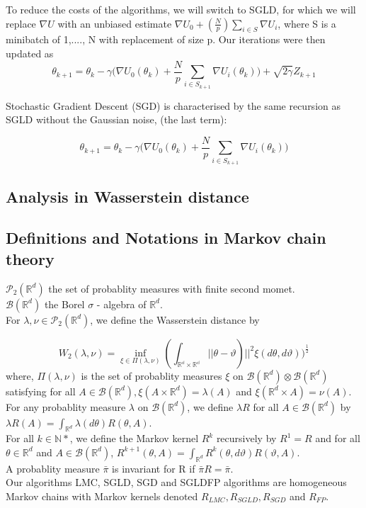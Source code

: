 To reduce the costs of the algorithms, we will switch to SGLD, for which we will replace $\nabla U$ with an unbiased estimate $\nabla U_0+(\frac{N}{p}) \sum_{i\in S}\nabla U_i$, where S is a minibatch of {1,...., N} with replacement of size p. Our iterations were then updated as
$$\theta_{k+1} = \theta_{k}-\gamma \Bigg (\nabla U_0(\theta_k)+\frac{N}{p}\sum_{i\in S_{k+1}}\nabla U_i(\theta_k)\Bigg )+\sqrt{2\gamma}Z_{k+1}$$

Stochastic Gradient Descent (SGD) is characterised by the same recursion as SGLD without the Gaussian noise, (the last term):


$$\theta_{k+1} = \theta_{k}-\gamma \Bigg (\nabla U_0(\theta_k)+\frac{N}{p}\sum_{i\in S_{k+1}}\nabla U_i(\theta_k)\Bigg)$$

\subsection{Analysis in Wasserstein distance}
\subsection{Definitions and Notations in Markov chain theory}
$\mathcal{P}_2(\mathbb{R}^d)$ the set of probablity measures with finite second momet.\\
$\mathcal{B}(\mathbb{R}^d)$ the Borel $\sigma$ - algebra of $\mathbb{R}^d$.\\
For $\lambda, \nu \in \mathcal{P}_2(\mathbb{R}^d)$, we define the Wasserstein distance by 

$$W_2(\lambda, \nu) =\inf_{\xi \in \Pi(\lambda, \nu)}(\int_{\mathbb{\mathbb{R}^d \times \mathbb{R}^d}}||\theta-\vartheta)||^2 \xi(d\theta, d\vartheta))^{\frac{1}{2}}$$
where, $\Pi(\lambda, \nu)$ is the set of probablity measures $\xi$ on $\mathcal{B}(\mathbb{R}^d)\otimes\mathcal{B}(\mathbb{R}^d)$ satisfying for all $A \in \mathcal{B}(\mathbb{R}^d), \xi(A \times \mathbb{R}^d)= \lambda(A)$ and $\xi (\mathbb{R}^d \times A) = \nu(A)$.\\
For any probablity measure $\lambda$ on $\mathcal{B}(\mathbb{R}^d)$, we define $\lambda R$ for all $A \in \mathcal{B}(\mathbb{R}^d)$ by $\lambda R(A) = \int_{\mathbb{R}^d}\lambda(d\theta)R(\theta, A)$.\\
For all $k\in \mathbb{N}*$, we define the Markov kernel $R^k$ recursively by $R^1 = R$ and for all $\theta \in \mathbb{R}^d$ and $A \in \mathcal{B}(\mathbb{R}^d)$, $R^{k+1}(\theta, A) = \int_{\mathbb{R}^d}  R^k(\theta, d\vartheta)R(\vartheta, A).$\\
A probablity measure $\bar{\pi}$ is invariant for R if $\bar{\pi}R = \bar{\pi}$.\\
Our algorithms LMC, SGLD, SGD and SGLDFP algorithms are homogeneous Markov chains with Markov kernels denoted $R_{LMC}, R_{SGLD}, R_{SGD}$ and $R_{FP}$.

